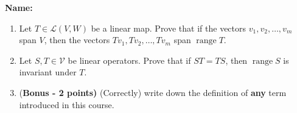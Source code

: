 \documentclass[12pt]{article}
\newcommand{\points}[1]{\marginpar{\hspace{24pt}[#1]}}
\DeclareMathOperator{\range}{range}
\begin{document}
\thispagestyle{fancy}
{\bf Name:}

\bigskip

\begin{enumerate}
 \item Let $T\in\mathcal{L}(V,W)$ be a linear map. Prove that if the vectors $v_1,v_2,\ldots, v_m$ span $V$, then the vectors $Tv_1,Tv_2,\ldots, Tv_m$ span $\range T$.\points{5}

 \item Let $S,T\in \mathcal{V}$ be linear operators. Prove that if $ST=TS$, then $\range S$ is invariant under $T$. \points{5}

 \item {(\bf Bonus - 2 points)} (Correctly) write down the definition of {\bf any} term introduced in this course.
\end{enumerate}
\end{document}
